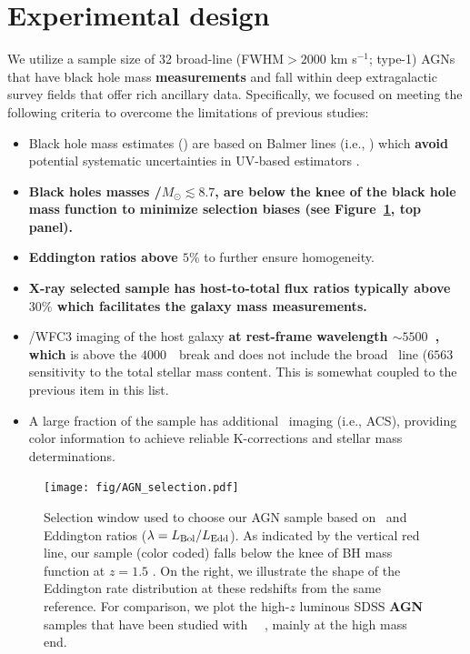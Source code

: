 \documentclass[apj]{emulateapj}
\begin{document}
\section{Experimental design}
\label{sec:data}
We utilize a sample size of 32 broad-line (FWHM$>2000$ km s$^{-1}$; type-1) AGNs that have black hole mass {\bf measurements} and fall within deep extragalactic survey fields that offer rich ancillary data. Specifically, we focused on meeting the following criteria to overcome the limitations of previous studies:

\begin{itemize}

\item Black hole mass estimates (\mbh) are based on Balmer lines (i.e., \halpha) which {\bf avoid} potential systematic uncertainties in UV-based estimators \citep{Greene2005}.

\item {\bf Black holes masses \mbh/$M_{\odot}\lesssim8.7$, are below the knee of the black hole mass function to minimize selection biases (see Figure~\ref{fig:selection}, top panel).} %

\item {\bf Eddington ratios above $5\%$} to further ensure homogeneity.

\item {\bf X-ray selected sample has host-to-total flux ratios typically above $30\%$ which facilitates the galaxy mass measurements.} %

\item \hst/WFC3 imaging of the host galaxy {\bf at rest-frame wavelength $\sim5500$~\angstrom, which} is above the $4000$~\angstrom\ break and does not include the broad \halpha\ line ($6563$~ sensitivity to the total stellar mass content. This is somewhat coupled to the previous item in this list.

\item A large fraction of the sample has additional \hst\ imaging (i.e., ACS), providing color information to achieve reliable K-corrections and stellar mass determinations. 
\end{itemize}

\begin{figure}
\centering
{
\texttt{[image: fig/AGN\_selection.pdf]}
}
\caption{\label{fig:selection} Selection window used to choose our AGN sample based on  \mbh~and Eddington ratios ($\lambda = L_{\rm Bol}/L_{\rm Edd}$). As indicated by the vertical red line, our sample (color coded) falls below the knee of BH mass function at $z=1.5$ \citep[top panel,][]{Schulze2015}. On the right, we illustrate the shape of the Eddington rate distribution at these redshifts from the same reference. For comparison, we plot the high-$z$ luminous SDSS {\bf AGN} samples that have been studied with \hst\ ~\citep[grey squares and circles from][respectively]{Peng2006a, Decarli2010}, mainly at the high mass end.}
\end{figure} 
\end{document}
